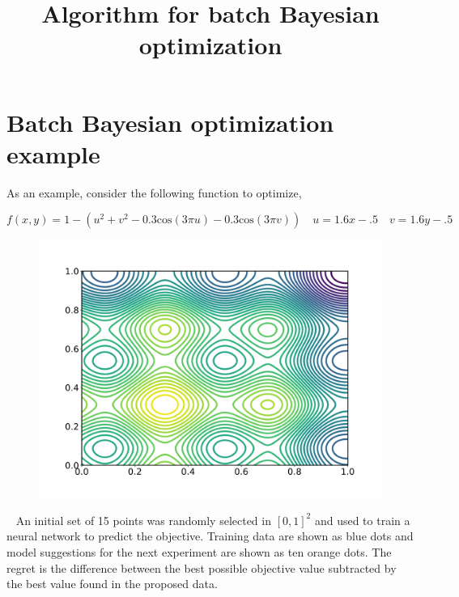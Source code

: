 \documentclass[11pt]{article} %
\title{Algorithm for batch Bayesian optimization}
\author{}
\date{} %
\begin{document}

\section*{Batch Bayesian optimization example}

As an example, consider the following function to optimize, 

\begin{equation}
f(x, y) = 1 - (u^2 + v^2 - 0.3 \mathrm{cos} (3 \pi u) - 0.3 \mathrm{cos} (3 \pi v)) \quad u = 1.6 x - .5 \quad v = 1.6 y - .5 
\label{cosines}
\end{equation}

\begin{figure}[h!]
\centering
\includegraphics[width=5.in]{Figures/objective.pdf}
\end{figure} 

~\newline
An initial set of 15 points was randomly selected in $[0, 1]^2$ and used to train a neural network to predict the objective. Training data are shown as blue dots and model suggestions for the next experiment are shown as ten orange dots. The regret is the difference between the best possible objective value subtracted by the best value found in the proposed data.  
\end{document}
